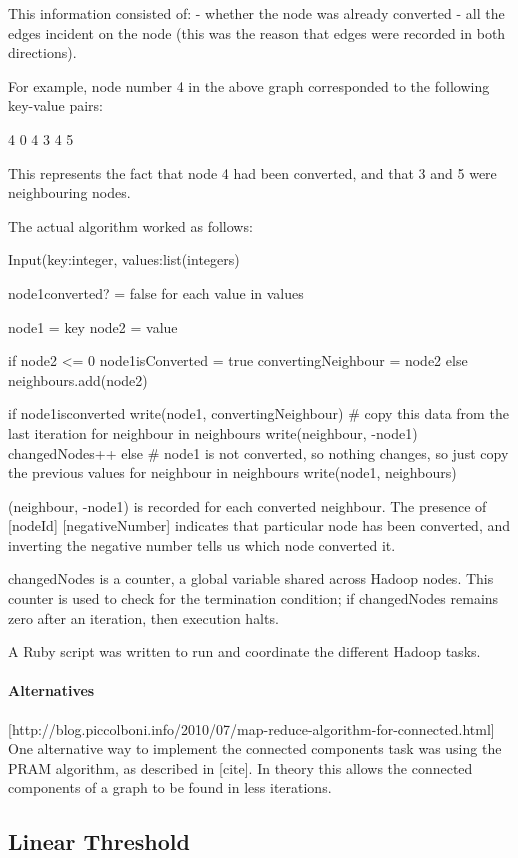 This information consisted of:
- whether the node was already converted
- all the edges incident on the node (this was the reason that edges were recorded in both directions).

For example, node number 4 in the above graph corresponded to the following key-value pairs:

4 0
4 3
4 5

This represents the fact that node 4 had been converted, and that 3 and 5 were neighbouring nodes.

The actual algorithm worked as follows:

Input(key:integer, values:list(integers)

node1converted? = false
for each value in values {
  node1 = key
  node2 = value

  if node2 <= 0 {
    node1isConverted = true
    convertingNeighbour = node2
  } else {
    neighbours.add(node2)
  }
}

if node1isconverted {
  write(node1, convertingNeighbour) # copy this data from the last iteration
  for neighbour in neighbours {
    write(neighbour, -node1)
    changedNodes++
  } 
} else {
    # node1 is not converted, so nothing changes, so just copy the previous values
    for neighbour in neighbours {
      write(node1, neighbours)
    }            
} 

(neighbour, -node1) is recorded for each converted neighbour. The presence of [nodeId] [negativeNumber] indicates that particular node has been converted, and inverting the negative number tells us which node converted it.

changedNodes is a counter, a global variable shared across Hadoop nodes. This counter is used to check for the termination condition; if changedNodes remains zero after an iteration, then execution halts.

A Ruby script was written to run and coordinate the different Hadoop tasks.

\paragraph{Alternatives}

[http://blog.piccolboni.info/2010/07/map-reduce-algorithm-for-connected.html] One alternative way to implement the connected components task was using the PRAM algorithm, as described in [cite]. In theory this allows the connected components of a graph to be found in less iterations.

\subsection{Linear Threshold}

